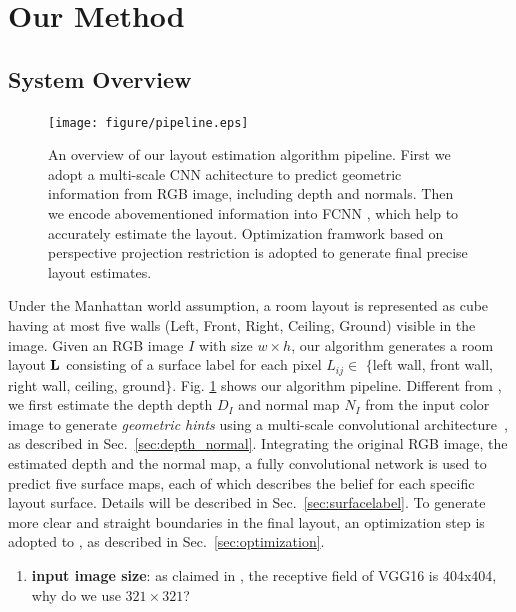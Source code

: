 \section{Our Method}
\label{sec:Meth}


\subsection{System Overview}
\label{subsection:overview}

\begin{figure}[!htq]
	\centering
	\texttt{[image: figure/pipeline.eps]}
	\caption{An overview of our layout estimation algorithm pipeline. First we adopt a multi-scale CNN achitecture to predict geometric information from RGB image, including depth and normals. Then we encode abovementioned information into FCNN , which help to accurately estimate the layout. Optimization framwork based on perspective projection restriction is adopted to generate final precise layout estimates.}
	\label{fig:pipeline}
\end{figure}

Under the Manhattan world assumption, a room layout is represented as cube having at most five walls (Left, Front, Right, Ceiling, Ground) visible in the image. 
%
Given an RGB image $I$ with  size $w\times h$, our algorithm generates a room layout $\mathbf{L}$ consisting of a surface label for each pixel $L_{ij}\in $ $\{$left wall, front wall, right wall, ceiling, ground$\}$. 
Fig. \ref{fig:pipeline} shows our algorithm pipeline. 
Different from \cite{dasgupta2016delay}, we first estimate the depth depth $D_{I}$ and normal map $N_{I}$ from the input color image to generate \emph{geometric hints} using a multi-scale convolutional architecture~\cite{eigen2015predicting}, as described in Sec.~\ref{sec:depth_normal}.
Integrating the original RGB image, the estimated depth and the normal map, a fully convolutional network is used to predict five surface maps, each of which describes the belief for each specific layout surface. Details will be described in Sec.~\ref{sec:surfacelabel}.
To generate more clear and straight boundaries in the final layout, an optimization step is adopted to , as described in Sec.~\ref{sec:optimization}.



\begin{enumerate}
	\item \textbf{input image size}: as claimed in \cite{ren2016three}, the receptive field of VGG16 is 404x404, why do we use $321\times 321$?

\end{enumerate}
 

